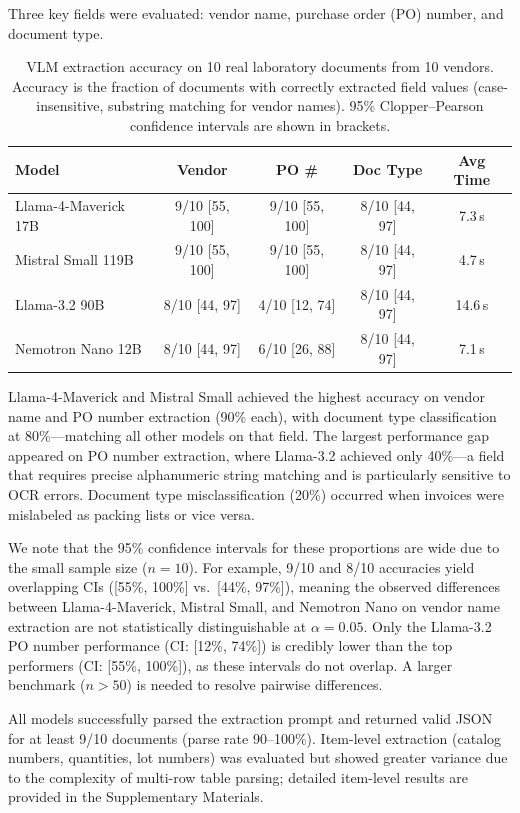 \documentclass[11pt]{article}
\begin{document}
Three key fields were evaluated: vendor name, purchase order (PO) number,
and document type.

\begin{table}[ht]
\centering
\caption{VLM extraction accuracy on 10 real laboratory documents from 10
  vendors. Accuracy is the fraction of documents with correctly extracted
  field values (case-insensitive, substring matching for vendor names).
  95\% Clopper--Pearson confidence intervals are shown in brackets.}
\label{tab:benchmark}
\small
\begin{tabular}{lcccc}
\toprule
\textbf{Model} & \textbf{Vendor} & \textbf{PO \#} &
  \textbf{Doc Type} & \textbf{Avg Time} \\
\midrule
Llama-4-Maverick 17B & 9/10 [55, 100] & 9/10 [55, 100] & 8/10 [44, 97] & 7.3\,s \\
Mistral Small 119B & 9/10 [55, 100] & 9/10 [55, 100] & 8/10 [44, 97] & 4.7\,s \\
Llama-3.2 90B & 8/10 [44, 97] & 4/10 [12, 74] & 8/10 [44, 97] & 14.6\,s \\
Nemotron Nano 12B & 8/10 [44, 97] & 6/10 [26, 88] & 8/10 [44, 97] & 7.1\,s \\
\bottomrule
\end{tabular}
\end{table}

Llama-4-Maverick and Mistral Small achieved the highest accuracy on
vendor name and PO number extraction (90\% each), with document type
classification at 80\%---matching all other models on that field. The
largest performance gap appeared on PO number extraction, where Llama-3.2
achieved only 40\%---a field that requires precise alphanumeric string
matching and is particularly sensitive to OCR errors. Document type
misclassification (20\%) occurred when invoices were mislabeled as packing
lists or vice versa.

We note that the 95\% confidence intervals for these proportions are
wide due to the small sample size ($n = 10$). For example, 9/10 and 8/10
accuracies yield overlapping CIs ([55\%, 100\%] vs.\ [44\%, 97\%]),
meaning the observed differences between Llama-4-Maverick, Mistral Small,
and Nemotron Nano on vendor name extraction are not statistically
distinguishable at $\alpha = 0.05$. Only the Llama-3.2 PO number
performance (CI: [12\%, 74\%]) is credibly lower than the top performers
(CI: [55\%, 100\%]), as these intervals do not overlap. A larger
benchmark ($n > 50$) is needed to resolve pairwise differences.

All models successfully parsed the extraction prompt and returned valid
JSON for at least 9/10 documents (parse rate 90--100\%). Item-level
extraction (catalog numbers, quantities, lot numbers) was evaluated but
showed greater variance due to the complexity of multi-row table parsing;
detailed item-level results are provided in the Supplementary Materials.
\end{document}
